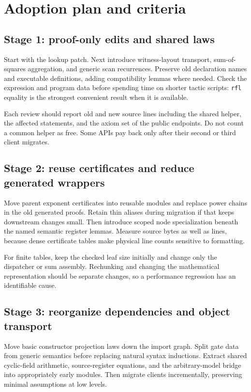 \documentclass[11pt,letterpaper]{article}
\newcommand{\code}[1]{\nolinkurl{#1}}
\begin{document}
\section{Adoption plan and criteria}

\subsection{Stage 1: proof-only edits and shared laws}

Start with the lookup patch. Next introduce witness-layout transport,
sum-of-squares aggregation, and generic scan recurrences. Preserve old
declaration names and executable definitions, adding compatibility lemmas
where needed. Check the expression and program data before spending time
on shorter tactic scripts: \code{rfl} equality is the strongest convenient
result when it is available.

Each review should report old and new source lines including the shared
helper, the affected statements, and the axiom set of the public endpoints.
Do not count a common helper as free. Some APIs pay back only after their
second or third client migrates.

\subsection{Stage 2: reuse certificates and reduce generated wrappers}

Move parent exponent certificates into reusable modules and replace power
chains in the old generated proofs. Retain thin aliases during migration
if that keeps downstream changes small. Then introduce scoped node
specialization beneath the named semantic register lemmas. Measure source
bytes as well as lines, because dense certificate tables make physical
line counts sensitive to formatting.

For finite tables, keep the checked leaf size initially and change only
the dispatcher or sum assembly. Rechunking and changing the mathematical
representation should be separate changes, so a performance regression
has an identifiable cause.

\subsection{Stage 3: reorganize dependencies and object transport}

Move basic constructor projection laws down the import graph. Split gate
data from generic semantics before replacing natural syntax inductions.
Extract shared cyclic-field arithmetic, source-register equations, and
the arbitrary-model bridge into appropriately early modules. Then migrate
clients incrementally, preserving minimal assumptions at low levels.
\end{document}
